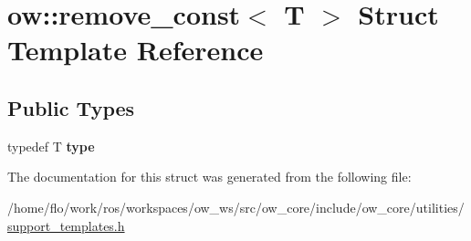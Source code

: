 \hypertarget{structow_1_1remove__const}{}\section{ow\+:\+:remove\+\_\+const$<$ T $>$ Struct Template Reference}
\label{structow_1_1remove__const}
\subsection*{Public Types}
\begin{DoxyCompactItemize}
\item 
typedef T {\bfseries type}\hypertarget{structow_1_1remove__const_a3b6fa81019d0c8d692aa0550b58eb49e}{}\label{structow_1_1remove__const_a3b6fa81019d0c8d692aa0550b58eb49e}

\end{DoxyCompactItemize}


The documentation for this struct was generated from the following file\+:\begin{DoxyCompactItemize}
\item 
/home/flo/work/ros/workspaces/ow\+\_\+ws/src/ow\+\_\+core/include/ow\+\_\+core/utilities/\hyperlink{support__templates_8h}{support\+\_\+templates.\+h}\end{DoxyCompactItemize}
